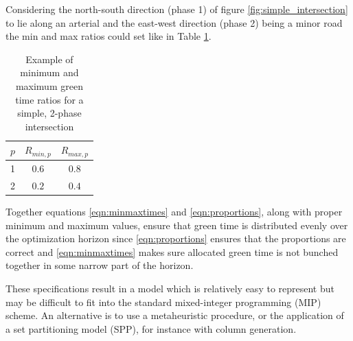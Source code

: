 Considering the north-south direction (phase 1) of figure
\ref{fig:simple_intersection} to lie along an arterial and the
east-west direction (phase 2) being a minor road the min and max
ratios could set like in Table \ref{tbl:minmaxratios}.

\begin{table}[!ht]
\begin{center}
\begin{tabular}{c|c|c}
$p$ & $R_{min,p}$ & $R_{max,p}$ \\ \hline
1 & $0.6$ & $0.8$ \\ 
2 & $0.2$ & $0.4$
\end{tabular}
\end{center}
\caption{Example of minimum and maximum green time ratios for a simple, 2-phase intersection}
\label{tbl:minmaxratios}
\end{table}

Together equations \ref{eqn:minmaxtimes} and \ref{eqn:proportions},
along with proper minimum and maximum values, ensure that green time
is distributed evenly over the optimization horizon since
\ref{eqn:proportions} ensures that the proportions are correct and
\ref{eqn:minmaxtimes} makes sure allocated green time is not bunched
together in some narrow part of the horizon.

These specifications result in a model which is relatively easy to
represent but may be difficult to fit into the standard mixed-integer
programming (MIP) scheme. An alternative is to use a metaheuristic
procedure, or the application of a set partitioning model (SPP), for
instance with column generation.
